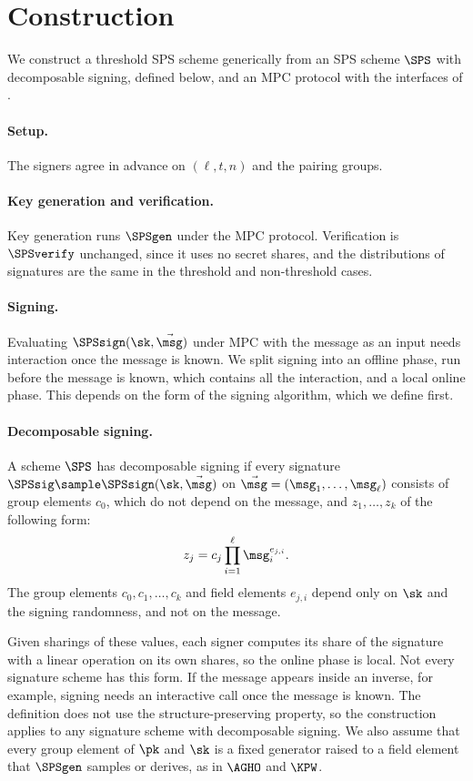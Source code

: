 \section{Construction}\label{sec:tsps-construction}

We construct a threshold SPS scheme generically from an SPS scheme $\SPS$ with
decomposable signing, defined below, and an MPC protocol with the interfaces of
.

\paragraph{Setup.} The signers agree in advance on $(\ell, t, n)$ and the
pairing groups.

\paragraph{Key generation and verification.} Key generation runs $\SPSgen$
under the MPC protocol. Verification is $\SPSverify$ unchanged, since it uses no
secret shares, and the distributions of signatures are the same in the threshold
and non-threshold cases.

\paragraph{Signing.} Evaluating $\SPSsign(\sk, \vec{\msg})$ under MPC with the message as an input
needs interaction once the message is known. We split signing into an offline
phase, run before the message is known, which contains all the interaction, and
a local online phase. This depends on the
form of the signing algorithm, which we define first.

\paragraph{Decomposable signing.} A scheme $\SPS$ has decomposable signing if every
signature $\SPSsig \sample \SPSsign(\sk, \vec{\msg})$ on $\vec{\msg} = (\msg_1,
\ldots, \msg_\ell)$ consists of group elements $c_0$, which do not depend on the
message, and $z_1, \ldots, z_k$ of the following form:
%
\begin{equation*}
%
  z_j = c_j \prod_{i=1}^{\ell} \msg_i^{e_{j,i}}.
%
\end{equation*}
%
The group elements $c_0, c_1, \ldots, c_k$ and field elements $e_{j,i}$
depend only on $\sk$ and the signing randomness, and not on the message.

Given sharings of these values, each signer computes its share of the signature
with a linear operation on its own shares, so the online phase is local. Not
every signature scheme has this form. If the message appears inside an inverse,
for example, signing needs an interactive call once the message is known. The
definition does not use the structure-preserving property, so the construction
applies to any signature scheme with decomposable signing. We also assume that every group element of
$\pk$ and $\sk$ is a fixed generator raised to a field element that $\SPSgen$
samples or derives, as in $\AGHO$ and $\KPW$.

